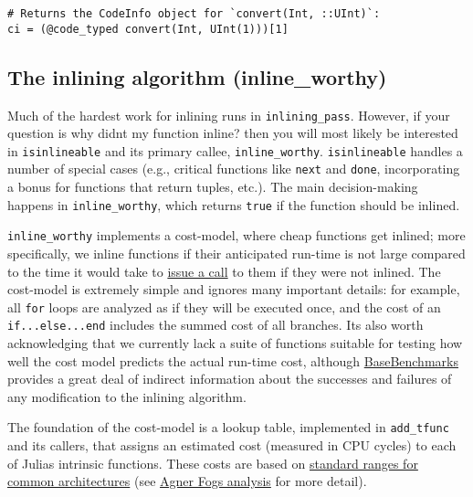 \begin{verbatim}
# Returns the CodeInfo object for `convert(Int, ::UInt)`:
ci = (@code_typed convert(Int, UInt(1)))[1]
\end{verbatim}



\hypertarget{3650644351684738912}{}


\subsection{The inlining algorithm (inline\_worthy)}



Much of the hardest work for inlining runs in \texttt{inlining\_pass}. However, if your question is {\textquotedbl}why didn{\textquotesingle}t my function inline?{\textquotedbl} then you will most likely be interested in \texttt{isinlineable} and its primary callee, \texttt{inline\_worthy}. \texttt{isinlineable} handles a number of special cases (e.g., critical functions like \texttt{next} and \texttt{done}, incorporating a bonus for functions that return tuples, etc.). The main decision-making happens in \texttt{inline\_worthy}, which returns \texttt{true} if the function should be inlined.



\texttt{inline\_worthy} implements a cost-model, where {\textquotedbl}cheap{\textquotedbl} functions get inlined; more specifically, we inline functions if their anticipated run-time is not large compared to the time it would take to \href{https://en.wikipedia.org/wiki/Calling\_convention}{issue a call} to them if they were not inlined. The cost-model is extremely simple and ignores many important details: for example, all \texttt{for} loops are analyzed as if they will be executed once, and the cost of an \texttt{if...else...end} includes the summed cost of all branches. It{\textquotesingle}s also worth acknowledging that we currently lack a suite of functions suitable for testing how well the cost model predicts the actual run-time cost, although \href{https://github.com/JuliaCI/BaseBenchmarks.jl}{BaseBenchmarks} provides a great deal of indirect information about the successes and failures of any modification to the inlining algorithm.



The foundation of the cost-model is a lookup table, implemented in \texttt{add\_tfunc} and its callers, that assigns an estimated cost (measured in CPU cycles) to each of Julia{\textquotesingle}s intrinsic functions. These costs are based on \href{http://ithare.com/wp-content/uploads/part101\_infographics\_v08.png}{standard ranges for common architectures} (see \href{https://www.agner.org/optimize/instruction\_tables.pdf}{Agner Fog{\textquotesingle}s analysis} for more detail).




